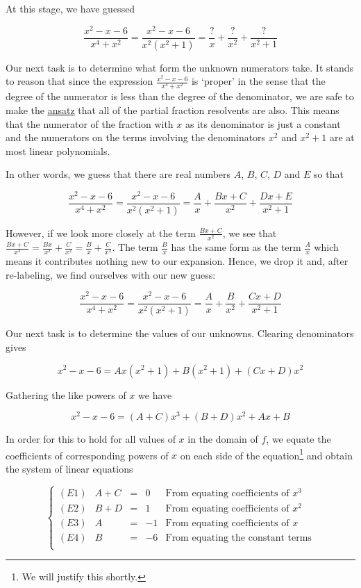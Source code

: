 \documentclass{ximera}
\begin{document}
At this stage, we have guessed

\[ \dfrac{x^2-x-6}{x^4+x^2} =  \dfrac{x^2-x-6}{x^2 \left(x^2+1\right)} = \dfrac{?}{x} + \dfrac{?}{x^2} + \dfrac{?}{x^2+1} \]

Our next task is to determine what form the unknown numerators take. It stands to reason that since the expression $\frac{x^2-x-6}{x^4+x^2}$ is `proper' in the sense that the degree of the numerator is less than the degree of the denominator, we are safe to make the \href{http://en.wikipedia.org/wiki/Ansatz}{\underline{ansatz}} that all of the partial fraction resolvents are also.  This means that the numerator of the fraction with $x$ as its denominator is just a constant and the numerators on the terms involving the denominators $x^2$ and $x^2+1$ are at most linear polynomials.  

In other words, we guess that there are real numbers $A$, $B$, $C$, $D$ and $E$ so that

\[ \dfrac{x^2-x-6}{x^4+x^2} =  \dfrac{x^2-x-6}{x^2 \left(x^2+1\right)} = \dfrac{A}{x} + \dfrac{Bx+C}{x^2} + \dfrac{Dx+E}{x^2+1} \]

However, if we look more closely at the term $\frac{Bx+C}{x^2}$, we see that $\frac{Bx+C}{x^2} = \frac{Bx}{x^2} + \frac{C}{x^2} = \frac{B}{x} + \frac{C}{x^2}$. The term $\frac{B}{x}$ has the same form as the term $\frac{A}{x}$ which means it contributes nothing new to our expansion.  Hence, we drop it and, after re-labeling, we find ourselves with our new guess:

\[ \dfrac{x^2-x-6}{x^4+x^2} =  \dfrac{x^2-x-6}{x^2 \left(x^2+1\right)} = \dfrac{A}{x} + \dfrac{B}{x^2} + \dfrac{Cx+D}{x^2+1} \] 

Our next task is to determine the values of our unknowns. Clearing denominators gives

\[x^2 - x- 6 = Ax\left(x^2+1\right) + B\left(x^2+1\right) + (Cx+D)x^2 \]

Gathering the like powers of $x$ we have

\[x^2 - x - 6 = (A+C)x^3+(B+D)x^2+Ax + B \]

In order for this to hold for all values of $x$ in the domain of $f$, we equate the coefficients of corresponding powers of $x$ on each side of the equation\footnote{We will justify this shortly.} and obtain the system of linear equations

\[ \left\{ \begin{array}{lrcrl} 
(E1) & A+C & = & 0 & \text{From equating coefficients of $x^{3}$} \\
(E2) & B+D & = & 1 & \text{From equating coefficients of $x^{2}$} \\
(E3) & A & = & -1 & \text{From equating coefficients of $x$} \\
(E4) & B & = & -6 & \text{From equating the constant terms} \\
\end{array} \right. \]
\end{document}
